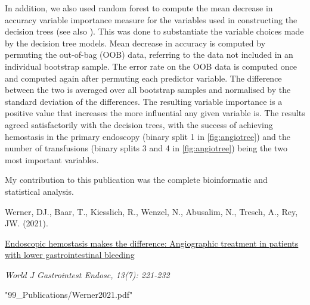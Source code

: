 In addition, we also used random forest to compute the mean decrease in
accuracy variable importance measure for the variables used in constructing
the decision trees \citep{Han2016} (see also ). This
was done to substantiate the variable choices made by the decision tree
models. Mean decrease in accuracy is computed by permuting the out-of-bag (OOB)
data, referring to the data not included in an individual bootstrap sample.
The error rate on the OOB data is computed once and computed again after
permuting each predictor variable.  The difference between the two is averaged
over all bootstrap samples and normalised by the standard deviation of the
differences. The resulting variable importance is a positive value that
increases the more influential any given variable is. The results agreed
satisfactorily with the decision trees, with the success of achieving
hemostasis in the primary endoscopy (binary split 1 in \cref{fig:angiotree})
and the number of transfusions (binary splits 3 and 4 in \cref{fig:angiotree})
being the two most important variables.

\vfill
\noindent My contribution to this publication was the complete bioinformatic
and statistical analysis.\nopagebreak
\medskip
\begin{tcolorbox}[
  boxrule=0pt, leftrule=1pt, colframe=s-blue, colback=white, sharp corners=all]%
  \raggedright
  Werner, DJ., Baar, T., Kiesslich, R., Wenzel, N., Abusalim, N., Tresch, A.,
  Rey, JW. (2021).
  
  \smallskip
  \href{https://www.wjgnet.com/1948-5190/full/v13/i7/221.htm}
    {Endoscopic hemostasis makes the difference: Angiographic treatment in
    patients with lower gastrointestinal bleeding}

  \smallskip
  \textit{World J Gastrointest Endosc, 13(7): 221-232}
\end{tcolorbox}



  {"99_Publications/Werner2021.pdf"}

\null
\thispagestyle{empty}
\newpage